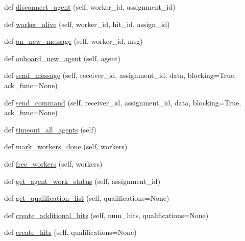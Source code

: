 \begin{DoxyCompactItemize}
\item 
def \hyperlink{classmock__turk__manager_1_1MockTurkManager_acbbf88a9423e37ee24ffb34f4ae4dd23}{disconnect\+\_\+agent} (self, worker\+\_\+id, assignment\+\_\+id)
\item 
def \hyperlink{classmock__turk__manager_1_1MockTurkManager_a617657d87cfb41c503404845b5c116c7}{worker\+\_\+alive} (self, worker\+\_\+id, hit\+\_\+id, assign\+\_\+id)
\item 
def \hyperlink{classmock__turk__manager_1_1MockTurkManager_af42c5f9de299e35fd89cd2508b88fbca}{on\+\_\+new\+\_\+message} (self, worker\+\_\+id, msg)
\item 
def \hyperlink{classmock__turk__manager_1_1MockTurkManager_aa71ab452422b7871d2fc2ae2b2b8af0d}{onboard\+\_\+new\+\_\+agent} (self, agent)
\item 
def \hyperlink{classmock__turk__manager_1_1MockTurkManager_a06ee464221ed467a72172cb19352e6eb}{send\+\_\+message} (self, receiver\+\_\+id, assignment\+\_\+id, data, blocking=True, ack\+\_\+func=None)
\item 
def \hyperlink{classmock__turk__manager_1_1MockTurkManager_a449a0fd9facd766c52565185f2f26054}{send\+\_\+command} (self, receiver\+\_\+id, assignment\+\_\+id, data, blocking=True, ack\+\_\+func=None)
\item 
def \hyperlink{classmock__turk__manager_1_1MockTurkManager_a71af67cf6b49970649e8fe697d7fef77}{timeout\+\_\+all\+\_\+agents} (self)
\item 
def \hyperlink{classmock__turk__manager_1_1MockTurkManager_a3d50ad06215dcfca8933bbe721e08cf4}{mark\+\_\+workers\+\_\+done} (self, workers)
\item 
def \hyperlink{classmock__turk__manager_1_1MockTurkManager_ad9f704e4d51b553552719888124f0d30}{free\+\_\+workers} (self, workers)
\item 
def \hyperlink{classmock__turk__manager_1_1MockTurkManager_aca873103221a5278f8ae5f8817f5c2fa}{get\+\_\+agent\+\_\+work\+\_\+status} (self, assignment\+\_\+id)
\item 
def \hyperlink{classmock__turk__manager_1_1MockTurkManager_aeeba2b664e85ee8792421d476971685d}{get\+\_\+qualification\+\_\+list} (self, qualifications=None)
\item 
def \hyperlink{classmock__turk__manager_1_1MockTurkManager_a3644780737b7f268c9b431e6f9f36e91}{create\+\_\+additional\+\_\+hits} (self, num\+\_\+hits, qualifications=None)
\item 
def \hyperlink{classmock__turk__manager_1_1MockTurkManager_a9cffef620da3856cd60016846883cd75}{create\+\_\+hits} (self, qualifications=None)

\end{DoxyCompactItemize}
